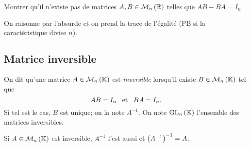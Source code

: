 \documentclass{magnolia}
\begin{document}
    \begin{exoUnique}
    \exo Montrer qu'il n'existe pas de matrices $A,B\in\mathcal{M}_{n}\left(\mathbb{R}\right)$ telles que
      $AB-BA=I_n$.
      \begin{sol}
      On raisonne par l'absurde et on prend la trace de l'égalité (PB si la caractéristique divise $n$).
      \end{sol}
    \end{exoUnique}

\subsection{Matrice inversible}

\begin{definition}[utile=-3]
  On dit qu'une matrice $A\in\mathcal{M}_{n}\left(\mathbb{K}\right)$ est \emph{inversible} lorsqu'il existe
  $B\in\mathcal{M}_{n}\left(\mathbb{K}\right)$ tel que
  \[AB=I_n \quad\!\text{et}\quad\! BA=I_n.\]
  Si tel est le cas, $B$ est unique; on la note $A^{-1}$. On note ${\rm GL}_{n}\left(\mathbb{K}\right)$
  l'ensemble des matrices inversibles.
  \end{definition}
  
\begin{remarqueUnique}
\remarque Si $A\in\mathcal{M}_{n}\left(\mathbb{K}\right)$ est inversible, $A^{-1}$ l'est aussi et
  $\left(A^{-1}\right)^{-1}=A$.
\end{remarqueUnique}
\end{document}
